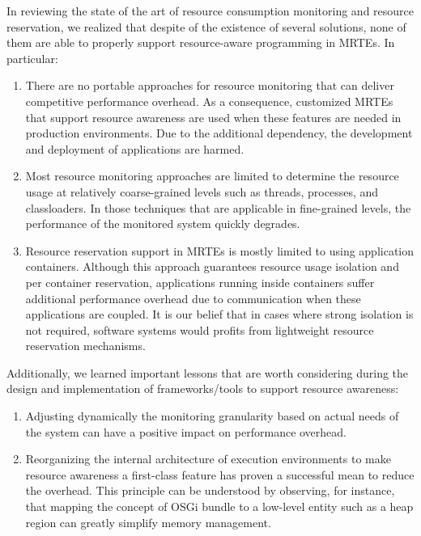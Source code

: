 In reviewing the state of the art of resource consumption monitoring and resource reservation, we realized that despite of the existence of several solutions, none of them are able to properly support resource-aware programming in MRTEs.
In particular:
\begin{enumerate}
\item There are no portable approaches for resource monitoring that can deliver competitive performance overhead.
As a consequence, customized MRTEs that support resource awareness are used when these features are needed in production environments.
Due to the additional dependency, the development and deployment of applications are harmed.

\item Most resource monitoring approaches are limited to determine the resource usage at relatively coarse-grained levels  such as threads, processes, and classloaders.
In those techniques that are applicable in fine-grained levels, the performance of the monitored system quickly degrades. 

\item Resource reservation support in MRTEs is mostly limited to using application containers.
Although this approach guarantees resource usage isolation and per container reservation, applications running inside containers suffer additional performance overhead due to communication when these applications are coupled.
It is our belief that in cases where strong isolation is not required, software systems would profits from lightweight resource reservation mechanisms. 
\end{enumerate}

Additionally, we learned important lessons that are worth considering during the design and implementation of frameworks/tools to support resource awareness:
\begin{enumerate}
\item Adjusting dynamically the monitoring granularity based on actual needs of the system can have
a positive impact on performance overhead.

\item Reorganizing the internal architecture of execution environments to make resource awareness a first-class feature has proven a successful mean to reduce the overhead.
This principle can be understood by observing, for instance, that mapping the concept of OSGi bundle to a low-level entity such as a heap region can greatly simplify memory management. 
\end{enumerate}

